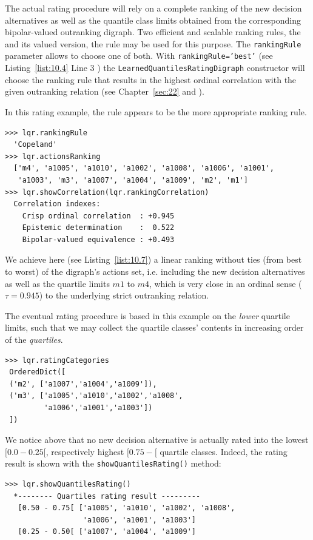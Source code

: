 The actual rating procedure will rely on a complete ranking of the new decision alternatives as well as the quantile class limits obtained from the corresponding bipolar-valued outranking digraph. Two efficient and scalable ranking rules, the \Copeland and its valued version, the \NetFlows rule may be used for this purpose. The \texttt{rankingRule} parameter allows to choose one of both. With \texttt{rankingRule='best'} (see Listing~\ref{list:10.4} Line 3 ) the \texttt{LearnedQuantiles\-RatingDigraph} constructor will choose the ranking rule that results in the highest ordinal correlation with the given outranking relation (see Chapter~\ref{sec:22} and \citep{BIS-2012a}).

In this rating example, the \Copeland rule appears to be the more appropriate ranking rule.
\begin{lstlisting}[caption={\Copeland ranking of new alternatives and historical quartile limits},label=list:10.7]
>>> lqr.rankingRule
  'Copeland'
>>> lqr.actionsRanking
  ['m4', 'a1005', 'a1010', 'a1002', 'a1008', 'a1006', 'a1001',
   'a1003', 'm3', 'a1007', 'a1004', 'a1009', 'm2', 'm1'] 
>>> lqr.showCorrelation(lqr.rankingCorrelation)
  Correlation indexes:
    Crisp ordinal correlation  : +0.945
    Epistemic determination    :  0.522
    Bipolar-valued equivalence : +0.493
\end{lstlisting}
We achieve here (see Listing~\ref{list:10.7}) a linear ranking without ties (from best to worst) of the digraph's actions set, i.e. including the new decision alternatives as well as the quartile limits $m1$ to $m4$, which is very close in an ordinal sense ($\tau = 0.945$) to the underlying strict outranking relation.

The eventual rating procedure is based in this example on the \emph{lower} quartile limits, such that we may collect the quartile classes' contents in increasing order of the \emph{quartiles}.
\begin{lstlisting}
>>> lqr.ratingCategories
 OrderedDict([
 ('m2', ['a1007','a1004','a1009']),
 ('m3', ['a1005','a1010','a1002','a1008',
         'a1006','a1001','a1003'])
 ])
\end{lstlisting}    
We notice above that no new decision alternative is actually rated into the lowest $[0.0-0.25[$, respectively highest $[0.75- [$ quartile classes. Indeed, the rating result is shown with the \texttt{showQuantilesRating()} method:
\begin{lstlisting}[caption={Absolute quartiles rating result},label=list:10.8]
>>> lqr.showQuantilesRating()
  *-------- Quartiles rating result ---------
   [0.50 - 0.75[ ['a1005', 'a1010', 'a1002', 'a1008',
                  'a1006', 'a1001', 'a1003']
   [0.25 - 0.50[ ['a1007', 'a1004', 'a1009']
\end{lstlisting}    

